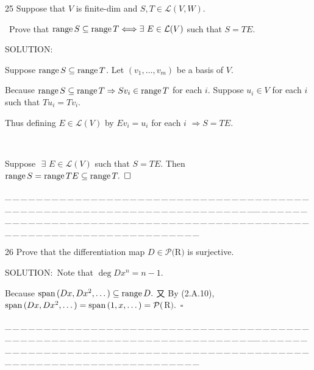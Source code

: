 \documentclass[a4paper, 11pt, UTF8]{article}
\def\range{\textup{range}\,}
\def\Spn{\textup{span}\,}
\def\Lm{\mathcal{L}}
\def\Po{\mathcal{P}}
\begin{document}
\begin{large}
{\timesbf\Large 25} {\timessl\Large 
Suppose that $V$ is finite-dim and $S, T\in\Lm(V, W)$.}\par\quad\,
{\timessl\Large Prove that $\range S\subseteq\range T\Longleftrightarrow\exists\,\,E\in\Lm(V)$ such that $S = TE$.
}\par
{\timesbf S\footnotesize{OLUTION:}}\par\quad
Suppose $\range S\subseteq\range T$. Let $(v_1,\dots,v_m)$ be a basis of $V$.\par\quad
Because $\range S\subseteq\range T\Rightarrow Sv_i\in\range T$ for each $i$. Suppose $u_i\in V$ for each $i$ such that $Tu_i=Tv_i$.\par\quad
Thus defining $E\in\Lm(V)$ by $Ev_i=u_i$ for each $i$ $\Rightarrow S=TE.$\par{\tiny{\,}\par}\quad
Suppose $\,\,\exists\,\,E\in\Lm(V)$ such that $S = TE$. Then $\range S=\range TE\subseteq\range T.\,\,\,\square$\par
{\tiny \_\,\_\,\_\,\_\,\_\,\_\,\_\,\_\,\_\,\_\,\_\,\_\,\_\,\_\,\_\,\_\,\_\,\_\,\_\,\_\,\_\,\_\,\_\,\_\,\_\,\_\,\_\,\_\,\_\,\_\,\_\,\_\,\_\,\_\,\_\,\_\,\_\,\_\,\_\,\_\,\_\,\_\,\_\,\_\,\_\,\_\,\_\,\_\,\_\,\_\,\_\,\_\,\_\,\_\,\_\,\_\,\_\,\_\,\_\,\_\,\_\,\_\,\_\,\_\,\_\,\_\,\_\,\_\,\_\,\_\,\_\_\,\_\,\_\,\_\,\_\,\_\,\_\,\_\,\_\,\_\,\_\,\_\,\_\,\_\,\_\,\_\,\_\,\_\,\_\,\_\,\_\,\_\,\_\,\_\,\_\,\_\,\_\,\_\,\_\,\_\,\_\,\_\,\_\,\_\,\_\,\_\,\_\,\_\,\_\,\_\,\_\,\_\,\_\,\_\,\_\,\_\,\_\,\_\,\_\,\_\,\_\,\_\,\_\,\_\,\_\,\_\,\_\,\_\,\_\,\_\,\_\,\_\,\_\,\_\,\_\,\_\,\_\,\_\,\_\,\_\,\_}\par

{\timesbf\Large 26} {\timessl\Large 
Prove that the differentiation map $D\in\Po(${\timesbf R}$)$ is surjective.
}\par
{\timesbf S\footnotesize{OLUTION:}}\,\,\,Note that $\deg Dx^n=n-1$.\par\quad
Because $\Spn(Dx,Dx^2,\dots)\subseteq\range D.$ 又 By (2.A.10), $\Spn(Dx,Dx^2,\dots)=\Spn(1,x,\dots)=\Po(${\timesbf R}$).\,\,\,\square$
\par
{\tiny \_\,\_\,\_\,\_\,\_\,\_\,\_\,\_\,\_\,\_\,\_\,\_\,\_\,\_\,\_\,\_\,\_\,\_\,\_\,\_\,\_\,\_\,\_\,\_\,\_\,\_\,\_\,\_\,\_\,\_\,\_\,\_\,\_\,\_\,\_\,\_\,\_\,\_\,\_\,\_\,\_\,\_\,\_\,\_\,\_\,\_\,\_\,\_\,\_\,\_\,\_\,\_\,\_\,\_\,\_\,\_\,\_\,\_\,\_\,\_\,\_\,\_\,\_\,\_\,\_\,\_\,\_\,\_\,\_\,\_\,\_\_\,\_\,\_\,\_\,\_\,\_\,\_\,\_\,\_\,\_\,\_\,\_\,\_\,\_\,\_\,\_\,\_\,\_\,\_\,\_\,\_\,\_\,\_\,\_\,\_\,\_\,\_\,\_\,\_\,\_\,\_\,\_\,\_\,\_\,\_\,\_\,\_\,\_\,\_\,\_\,\_\,\_\,\_\,\_\,\_\,\_\,\_\,\_\,\_\,\_\,\_\,\_\,\_\,\_\,\_\,\_\,\_\,\_\,\_\,\_\,\_\,\_\,\_\,\_\,\_\,\_\,\_\,\_\,\_\,\_\,\_}{\tiny\,\par}


\end{large}
\end{document}
